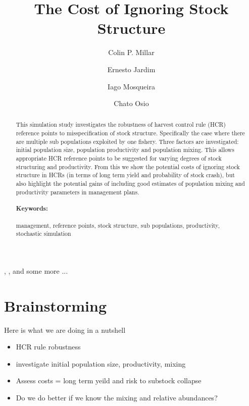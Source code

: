\documentclass[a4paper,english]{article}
\begin{document}
\cite{Rue_Held.2005} \cite{R.2012}, \cite{INLA.2009}, and some more ...


\title{\textbf{\LARGE The Cost of Ignoring Stock Structure}}

\author[1,*]{Colin P. Millar}
\author[1]{Ernesto Jardim}
\author[1]{Iago Mosqueira}
\author[1]{Chato Osio}

\date{}

\maketitle


\begin{abstract}
  This simulation study investigates the robustness of harvest control rule (HCR) reference points to misspecification of stock structure. Specifically the case where there are multiple sub populations exploited by one fishery. Three factors are investigated: initial population size, population productivity and population mixing. This allows appropriate HCR reference points to be suggested for varying degrees of stock structuring and productivity. From this we show the potential costs of ignoring stock structure in HCRs (in terms of long term yield and probability of stock crash), but also highlight the potential gains of including good estimates of population mixing and productivity parameters in management plans. \\

\paragraph{Keywords:} management, reference points, stock structure, sub populations, productivity, stochastic simulation
\end{abstract}


\section*{Brainstorming}

Here is what we are doing in a nutshell
\begin{itemize}
  \item HCR rule robustness
  \item investigate initial population size, productivity, mixing
  \item Assess costs = long term yeild and risk to substock collapse
  \item Do we do better if we know the mixing and relative abundances?
\end{itemize}
\end{document}
